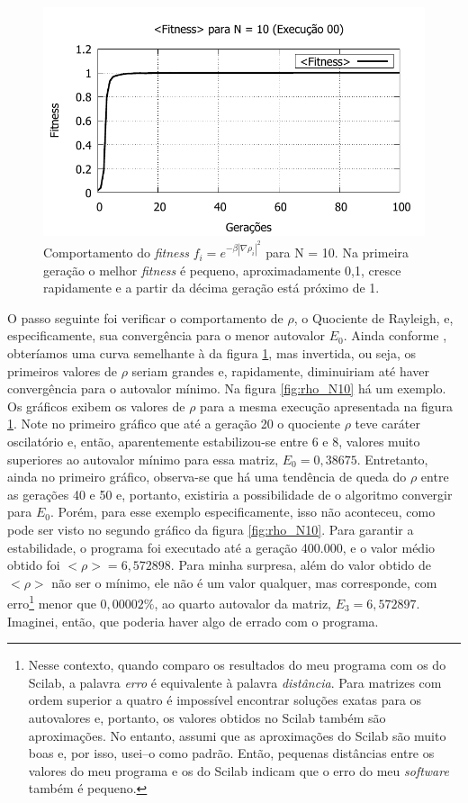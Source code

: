 	\begin{figure}[htbp]
		\centering
			\includegraphics{figs/resultados/fitnessGrad/N10_00_fitness.pdf}
			\caption{Comportamento do \textsl{fitness} $f_i = e^{-\beta |\nabla \rho_i|^2}$ para N = 10. Na primeira geração o melhor \textit{fitness} é pequeno, aproximadamente 0,1, cresce rapidamente e a partir da décima geração está próximo de 1.}
		\label{fig:compFitnessTipo1N10}
	\end{figure}
	
	O passo seguinte foi verificar o comportamento de $\rho$, o Quociente de Rayleigh, e, especificamente, sua convergência para o menor autovalor $E_0$. Ainda conforme \cite{metodo2004}, obteríamos uma curva semelhante à da figura \ref{fig:compFitnessTipo1N10}, mas invertida, ou seja, os primeiros valores de $\rho$ seriam grandes e, rapidamente, diminuiriam até haver convergência para o autovalor mínimo. Na figura \ref{fig:rho_N10} há um exemplo.	Os gráficos exibem os valores de $\rho$ para a mesma execução apresentada na figura \ref{fig:compFitnessTipo1N10}. Note no primeiro gráfico que até a geração 20 o quociente $\rho$ teve caráter oscilatório e, então, aparentemente estabilizou-se entre 6 e 8, valores muito superiores ao autovalor mínimo para essa matriz, $E_0 = 0,38675$. Entretanto, ainda no primeiro gráfico, observa-se que há uma tendência de queda do $\rho$ entre as gerações 40 e 50 e, portanto, existiria a possibilidade de o algoritmo convergir para $E_0$. Porém, para esse exemplo especificamente, isso não aconteceu, como pode ser visto no segundo gráfico da figura \ref{fig:rho_N10}. Para garantir a estabilidade, o programa foi executado até a geração 400.000, e o valor médio obtido foi $<\rho> = 6,572898$. Para minha surpresa, além do valor obtido de $<\rho>$ não ser o mínimo, ele não é um valor qualquer, mas corresponde, com erro\footnote{Nesse contexto, quando comparo os resultados do meu programa com os do Scilab, a palavra \emph{erro} é equivalente à palavra \emph{distância}. Para matrizes com ordem superior a quatro é impossível encontrar soluções exatas para os autovalores e, portanto, os valores obtidos no Scilab também são aproximações. No entanto, assumi que as aproximações do Scilab são muito boas e, por isso, usei--o como padrão. Então, pequenas distâncias entre os valores do meu programa e os do Scilab indicam que o erro do meu \emph{software} também é pequeno.} menor que $0,00002\%$, ao quarto autovalor da matriz, $E_3 = 6,572897$. Imaginei, então, que poderia haver algo de errado com o programa. 
	
